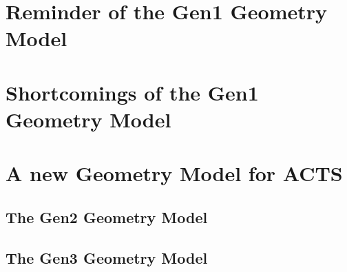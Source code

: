 \section{Reminder of the Gen1 Geometry Model}

\section{Shortcomings of the Gen1 Geometry Model}

\section{A new Geometry Model for ACTS}

\subsection{The Gen2 Geometry Model}

\subsection{The Gen3 Geometry Model}
